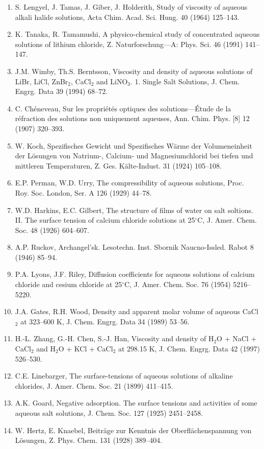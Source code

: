 \documentclass[11pt]{article}
\begin{document}
\begin{enumerate}
\item S. Lengyel, J. Tamas, J. Giber, J. Holderith, Study of viscosity of aqueous alkali halide solutions, Acta Chim. Acad. Sci. Hung. 40 (1964) 125--143.
\item K. Tanaka, R. Tamamushi, A physico-chemical study of concentrated aqueous solutions of lithium chloride, Z. Naturforschung---A: Phys. Sci. 46 (1991) 141--147.
\item J.M. Wimby, Th.S. Berntsson, Viscosity and density of aqueous solutions of LiBr, LiCl, ZnBr$_2$, CaCl$_2$ and LiNO$_3$. 1. Single Salt Solutions, J. Chem. Engrg. Data 39 (1994) 68--72.
\item C. Ch\'eneveau, Sur les propri\'et\'es optiques des solutions---\'Etude de la r\'efraction des solutions non uniquement aqueuses, Ann. Chim. Phys. [8] 12 (1907) 320--393.
\item W. Koch, Spezifisches Gewicht und Spezifisches W\"arme der Volumeneinheit der L\"osungen von Natrium-, Calcium- und Magnesiumchlorid bei tiefen und mittleren Temperaturen, Z. Ges. K\"alte-Indust. 31 (1924) 105--108.
\item E.P. Perman, W.D. Urry, The compressibility of aqueous solutions, Proc. Roy. Soc. London, Ser. A 126 (1929) 44--78.
\item W.D. Harkins, E.C. Gilbert, The structure of films of water on salt soltions. II. The surface tension of calcium chloride solutions at 25$^\circ$C, J. Amer. Chem. Soc. 48 (1926) 604--607.
\item A.P. Ruckov, Archangel'sk. Lesotechn. Inst. Sbornik Naucno-Issled. Rabot 8 (1946) 85--94.
\item P.A. Lyons, J.F. Riley, Diffusion coefficients for aqueous solutions of calcium chloride and cesium chloride at 25$^\circ$C, J. Amer. Chem. Soc. 76 (1954) 5216--5220.
\item J.A. Gates, R.H. Wood, Density and apparent molar volume of aqueous CaCl$_2$ at 323--600 K, J. Chem. Engrg. Data 34 (1989) 53--56.
\item H.-L. Zhang, G.-H. Chen, S.-J. Han, Viscosity and density of H$_2$O + NaCl + CaCl$_2$ and H$_2$O + KCl + CaCl$_2$ at 298.15 K, J. Chem. Engrg. Data 42 (1997) 526--530.
\item C.E. Linebarger, The surface-tensions of aqueous solutions of alkaline chlorides, J. Amer. Chem. Soc. 21 (1899) 411--415.
\item A.K. Goard, Negative adsorption. The surface tensions and activities of some aqueous salt solutions, J. Chem. Soc. 127 (1925) 2451--2458.
\item W. Hertz, E. Knaebel, Beitr\"age zur Kenntnis der Oberfl\"achenspannung von L\"osungen, Z. Phys. Chem. 131 (1928) 389--404.

\end{enumerate}
\end{document}
